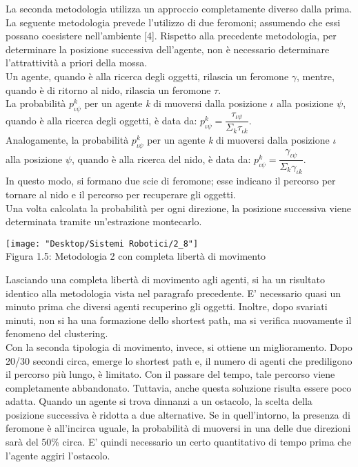\documentclass[12pt,a4paper,openright,twoside]{report}
\begin{document}
La seconda metodologia utilizza un approccio completamente diverso dalla prima. La seguente metodologia prevede l'utilizzo di due feromoni; assumendo che essi possano coesistere nell'ambiente [4]. Rispetto alla precedente metodologia, per determinare la posizione successiva dell'agente, non è necessario determinare l'attrattività a priori della mossa.\\
Un agente, quando è alla ricerca degli oggetti, rilascia un feromone $\gamma$, mentre, quando è di ritorno al nido, rilascia un feromone $\tau$.\\
La probabilità $p^k_{\iota\psi}$ per un agente \textit{k} di muoversi dalla posizione $\iota$ alla posizione $\psi$, quando è alla ricerca degli oggetti, è data da: $p^k_{\iota\psi}= \dfrac{\tau_{\iota\psi}}{\Sigma_k\tau_{\iota k}}$.\\
Analogamente, la probabilità $p^k_{\iota\psi}$ per un agente \textit{k} di muoversi dalla posizione $\iota$ alla posizione $\psi$, quando è alla ricerca del nido, è data da: $p^k_{\iota\psi}= \dfrac{\gamma_{\iota\psi}}{\Sigma_k\gamma_{\iota k}}$.\\
In questo modo, si formano due scie di feromone; esse indicano il percorso per tornare al nido e il percorso per recuperare gli oggetti.\\
Una volta calcolata la probabilità per ogni direzione, la posizione successiva viene determinata tramite un'estrazione montecarlo.\\

\begin{center}  
	\texttt{[image: "Desktop/Sistemi Robotici/2\_8"]}
	\\Figura 1.5: Metodologia 2 con completa libertà di movimento
\end{center}

Lasciando una completa libertà di movimento agli agenti, si ha un risultato identico alla metodologia vista nel paragrafo precedente. E' necessario quasi un minuto prima che diversi agenti recuperino gli oggetti. Inoltre, dopo svariati minuti, non si ha una formazione dello shortest path, ma si verifica nuovamente il fenomeno del clustering.\\
Con la seconda tipologia di movimento, invece, si ottiene un miglioramento.  Dopo 20/30 secondi circa, emerge lo shortest path e, il numero di agenti che prediligono il percorso più lungo, è limitato. Con il passare del tempo, tale percorso viene completamente abbandonato. Tuttavia, anche questa soluzione risulta essere poco adatta. Quando un agente si trova dinnanzi a un ostacolo, la scelta della posizione successiva è ridotta a due alternative. Se in quell'intorno, la presenza di feromone è all'incirca uguale, la probabilità di muoversi in una delle due direzioni sarà del 50\% circa. E' quindi necessario un certo quantitativo di tempo prima che l'agente aggiri l'ostacolo.\\
\end{document}
